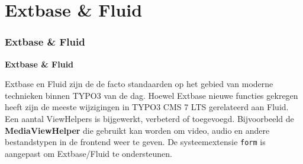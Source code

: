 %

\section{Extbase \& Fluid}
\begin{frame}[fragile]
	\frametitle{Extbase \& Fluid}

	\begin{center}\huge{\color{typo3darkgrey}\textbf{Extbase \& Fluid}}\end{center}

	Extbase en Fluid zijn de de facto standaarden op het gebied van moderne technieken
	binnen TYPO3 van de dag. Hoewel Extbase nieuwe functies gekregen heeft zijn de
	meeste wijzigingen in TYPO3 CMS 7 LTS gerelateerd aan Fluid.\newline
	Een aantal ViewHelpers is bijgewerkt, verbeterd of toegevoegd. Bijvoorbeeld de
	\textbf{MediaViewHelper} die gebruikt kan worden om video, audio en andere
	bestandstypen in de frontend weer te geven.\newline
	De systeemextensie \texttt{form} is aangepast om Extbase/Fluid te ondersteunen.

\end{frame}

